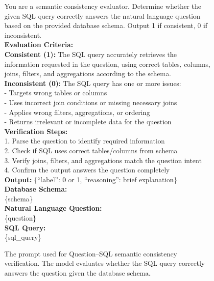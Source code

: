 \documentclass[letterpaper,journal]{IEEEtran}
\begin{document}
\begin{figure}[!ht]
\centering
\begin{tcolorbox}[
  enhanced,
  boxrule=0.5pt,
  colback=AliceBlue,
  colframe=Navy,
  colbacktitle=Navy,
  fonttitle=\bfseries\color{white}, 
  title=Prompt for Question--SQL Semantic Consistency Verification,
  arc=2mm,
  attach boxed title to top left={yshift=-2.5mm, xshift=3mm},
  boxed title style={arc=1mm},
  boxsep=5pt,
  left=8pt,
  right=8pt,
  top=6mm,
]
\scriptsize\ttfamily
You are a semantic consistency evaluator. Determine whether the given SQL query correctly answers the natural language question based on the provided database schema. Output 1 if consistent, 0 if inconsistent.\\[2ex]

\textbf{Evaluation Criteria:}\\[1ex]
\textbf{Consistent (1):} The SQL query accurately retrieves the information requested in the question, using correct tables, columns, joins, filters, and aggregations according to the schema.\\[1ex]

\textbf{Inconsistent (0):} The SQL query has one or more issues:\\
- Targets wrong tables or columns\\
- Uses incorrect join conditions or missing necessary joins\\
- Applies wrong filters, aggregations, or ordering\\
- Returns irrelevant or incomplete data for the question\\[2ex]

\textbf{Verification Steps:}\\
1. Parse the question to identify required information\\
2. Check if SQL uses correct tables/columns from schema\\
3. Verify joins, filters, and aggregations match the question intent\\
4. Confirm the output answers the question completely\\[2ex]

\textbf{Output:} \{``label'': 0 or 1, ``reasoning'': brief explanation\}\\[2ex]

\textbf{Database Schema:}\\
\{schema\}\\[2ex]

\textbf{Natural Language Question:}\\
\{question\}\\[2ex]

\textbf{SQL Query:}\\
\{sql\_query\}
\end{tcolorbox}
\caption{The prompt used for Question--SQL semantic consistency verification. The model evaluates whether the SQL query correctly answers the question given the database schema.}
\label{fig:prompt_consistency}
\end{figure}
\end{document}
